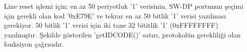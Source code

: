 Line reset işlemi için; en az 50 periyotluk '1' verisinin, SW-DP portunun şeçimi için gerekli olan kod '0xE79E' ve tekrar en az 50 bitlik '1' verisi yazılması gerekiyor. 50 bitlik '1' verisi için iki tane 32 bititlik '1' (0xFFFFFFFF) yazılmıştır. Şekilde gösterilen 'getIDCODE()' satırı, protokolün gerekliliği olan fonksiyon çağrısıdır.


